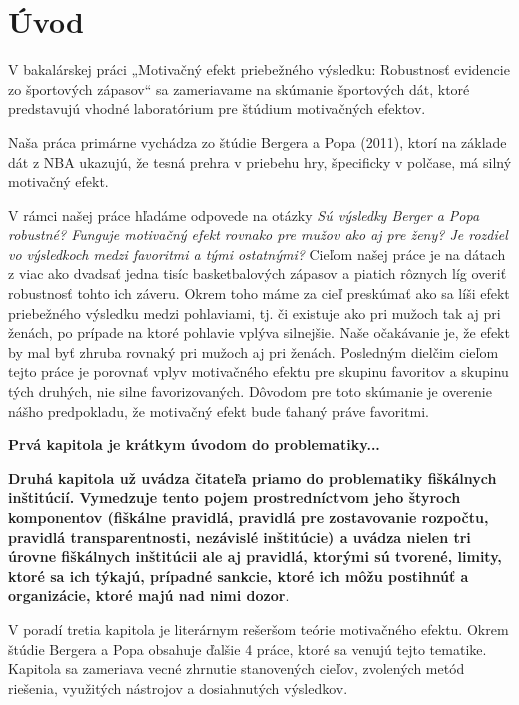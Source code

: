 \documentclass[
  digital, %
  oneside, %
  notable,   %
  lof,     %
  lot,     %
]{fithesis3}
\begin{document}
	\makeatletter
	\thesis@preamble %
	\makeatother
	
	\chapter*{Úvod}
	
	V bakalárskej práci „Motivačný efekt priebežného výsledku: Robustnosť evidencie zo športových zápasov“ sa zameriavame na skúmanie športových dát, ktoré predstavujú vhodné laboratórium pre štúdium motivačných efektov.
	
	Naša práca primárne vychádza zo štúdie Bergera a Popa (2011), ktorí na základe dát z NBA ukazujú, že tesná prehra v priebehu hry, špecificky v polčase, má silný motivačný efekt. 
	
	V rámci našej práce hľadáme odpovede na otázky \textit{Sú výsledky Berger a Popa robustné? Funguje motivačný efekt rovnako pre mužov ako aj pre ženy? Je rozdiel vo výsledkoch medzi favoritmi a tými ostatnými?} Cieľom našej práce je na dátach z viac ako dvadsať jedna tisíc basketbalových zápasov a piatich rôznych líg overiť robustnosť tohto ich záveru. Okrem toho máme za cieľ preskúmať ako sa líši efekt priebežného výsledku medzi pohlaviami, tj. či existuje ako pri mužoch tak aj pri ženách, po prípade na ktoré pohlavie vplýva silnejšie. Naše očakávanie je, že efekt by mal byť zhruba rovnaký pri mužoch aj pri ženách. Posledným dielčim cieľom tejto práce je porovnať vplyv motivačného efektu pre skupinu favoritov a skupinu tých druhých, nie silne favorizovaných. Dôvodom pre toto skúmanie je overenie nášho predpokladu, že motivačný efekt bude ťahaný práve favoritmi.
	
	\textbf{Prvá kapitola je krátkym úvodom do problematiky...}
	
	\textbf{Druhá kapitola už uvádza čitateľa priamo do problematiky fiškálnych inštitúcií. Vymedzuje tento pojem prostredníctvom jeho štyroch komponentov (fiškálne pravidlá, pravidlá pre zostavovanie rozpočtu, pravidlá transparentnosti, nezávislé inštitúcie) a uvádza nielen tri úrovne fiškálnych inštitúcii ale aj pravidlá, ktorými sú tvorené, limity, ktoré sa ich týkajú, prípadné sankcie, ktoré ich môžu postihnúť a organizácie, ktoré majú nad nimi dozor}.
	
	V poradí tretia kapitola je literárnym rešeršom teórie motivačného efektu. Okrem štúdie Bergera a Popa obsahuje ďalšie 4 práce, ktoré sa venujú tejto tematike. Kapitola sa zameriava vecné zhrnutie stanovených cieľov, zvolených metód riešenia, využitých nástrojov a dosiahnutých výsledkov. 
	
\end{document}
